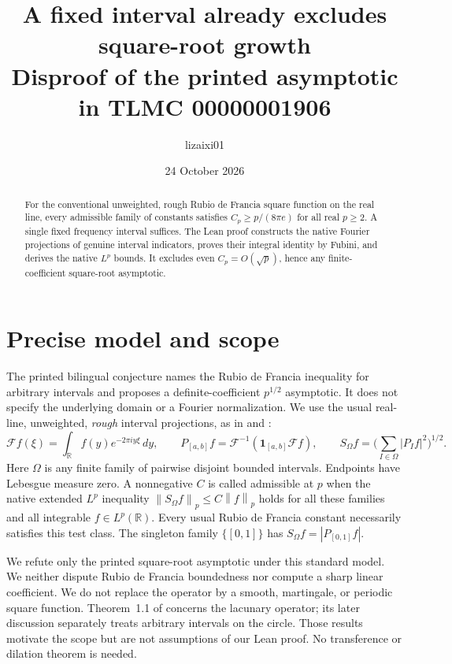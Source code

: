 \documentclass[10pt,a4paper]{article}
\title{A fixed interval already excludes square-root growth\\
\large Disproof of the printed asymptotic in TLMC 00000001906}
\author{lizaixi01}
\date{24 October 2026}
\newcommand{\R}{\mathbb R}
\newcommand{\F}{\mathcal F}
\newcommand{\ind}{\mathbf 1}
\newcommand{\norm}[1]{\left\lVert #1\right\rVert}
\begin{document}
\maketitle
\vspace{-1.3em}
\begin{abstract}
For the conventional unweighted, rough Rubio de Francia square function on the real line, every admissible family of constants satisfies
\(C_p\ge p/(8\pi e)\) for all real \(p\ge2\). A single fixed frequency interval suffices. The Lean proof constructs the native Fourier projections of genuine interval indicators, proves their integral identity by Fubini, and derives the native \(L^p\) bounds. It excludes even \(C_p=O(\sqrt p)\), hence any finite-coefficient square-root asymptotic.
\end{abstract}

\section{Precise model and scope}
The printed bilingual conjecture names the Rubio de Francia inequality for arbitrary intervals and proposes a definite-coefficient \(p^{1/2}\) asymptotic. It does not specify the underlying domain or a Fourier normalization. We use the usual real-line, unweighted, \emph{rough} interval projections, as in \cite[pp.~1--2]{grs} and \cite[p.~2, Eq.~(1.1)]{dp}:
\[
 \F f(\xi)=\int_\R f(y)e^{-2\pi i y\xi}\,dy,
 \qquad P_{[a,b]}f=\F^{-1}(\ind_{[a,b]}\F f),
 \qquad S_\Omega f=\Big(\sum_{I\in\Omega}|P_I f|^2\Big)^{1/2}.
\]
Here \(\Omega\) is any finite family of pairwise disjoint bounded intervals. Endpoints have Lebesgue measure zero. A nonnegative \(C\) is called admissible at \(p\) when the native extended \(L^p\) inequality \(\norm{S_\Omega f}_p\le C\norm f_p\) holds for all these families and all integrable \(f\in L^p(\R)\). Every usual Rubio de Francia constant necessarily satisfies this test class. The singleton family \(\{[0,1]\}\) has \(S_\Omega f=|P_{[0,1]}f|\).

We refute only the printed square-root asymptotic under this standard model. We neither dispute Rubio de Francia boundedness nor compute a sharp linear coefficient. We do not replace the operator by a smooth, martingale, or periodic square function. Theorem~1.1 of \cite{grs} concerns the lacunary operator; its later discussion separately treats arbitrary intervals on the circle. Those results motivate the scope but are not assumptions of our Lean proof. No transference or dilation theorem is needed.
\end{document}
